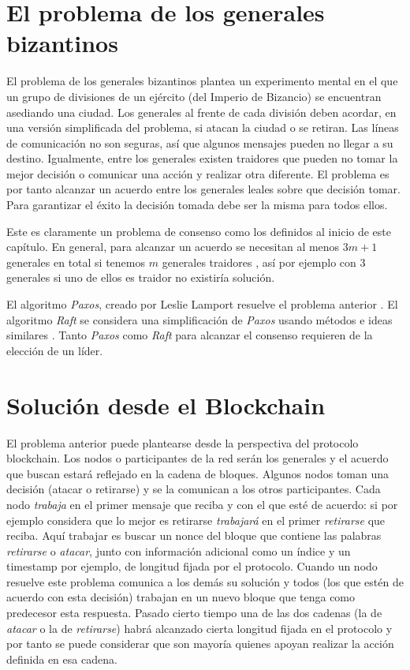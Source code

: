 \section{El problema de los generales bizantinos}
El problema de los generales bizantinos \citep{byzantine generals} plantea un experimento mental en el que un grupo de divisiones de un ejército (del Imperio de Bizancio) se encuentran asediando una ciudad. Los generales al frente de cada división deben acordar, en una versión simplificada del problema, si atacan la ciudad o se retiran. Las líneas de comunicación no son seguras, así que algunos mensajes pueden no llegar a su destino. Igualmente, entre los generales existen traidores que pueden no tomar la mejor decisión o comunicar una acción y realizar otra diferente.
El problema es por tanto alcanzar un acuerdo entre los generales leales sobre que decisión tomar. Para garantizar el éxito la decisión tomada debe ser la misma para todos ellos.

Este es claramente un problema de consenso como los definidos al inicio de este capítulo. En general, para alcanzar un acuerdo se necesitan al menos $3m+1$ generales en total si tenemos $m$ generales traidores \citep{byzantine generals}, así por ejemplo con 3 generales si uno de ellos es traidor no existiría solución.

El algoritmo \textit{Paxos}, creado por  Leslie Lamport resuelve el problema anterior \citep{paxos}. El algoritmo \textit{Raft} se considera una simplificación de \textit{Paxos} usando métodos e ideas similares \citep{raft}. Tanto \textit{Paxos} como \textit{Raft} para alcanzar el consenso requieren de la elección de un líder.

\section{Solución desde el Blockchain}
El problema anterior puede plantearse desde la perspectiva del protocolo blockchain. Los nodos o participantes de la red serán los generales y el acuerdo que buscan estará reflejado en la cadena de bloques. Algunos nodos toman una decisión (atacar o retirarse) y se la comunican a los otros participantes. Cada nodo \textit{trabaja} en el primer mensaje que reciba y con el que esté de acuerdo: si por ejemplo considera que lo mejor es retirarse \textit{trabajará} en el primer \textit{retirarse} que reciba. Aquí trabajar es buscar un nonce del bloque que contiene las palabras \textit{retirarse} o \textit{atacar}, junto con información adicional como un índice y un timestamp por ejemplo, de longitud fijada por el protocolo. Cuando un nodo resuelve este problema comunica a los demás su solución y todos (los que estén de acuerdo con esta decisión) trabajan en un nuevo bloque que tenga como predecesor esta respuesta. Pasado cierto tiempo una de las dos cadenas (la de \textit{atacar} o la de \textit{retirarse}) habrá alcanzado cierta longitud fijada en el protocolo y por tanto se puede considerar que son mayoría quienes apoyan realizar la acción definida en esa cadena.

